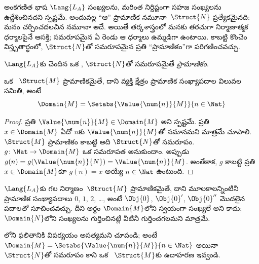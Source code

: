 \documentclass[../../../include/open-logic-section]{subfiles}
\begin{document}

అంకగణిత భాష $\Lang{L_A}$ సంఖ్యలను, మరింత నిర్దిష్టంగా సహజ
సంఖ్యలను ఉద్దేశించినదని స్పష్టమే. అందువల్ల “ఆ” ప్రామాణిక
నమూనా~$\Struct{N}$ ప్రత్యేకమైనది: మనం చర్చించదలచిన నమూనా అదే.
అయితే తర్కశాస్త్రంలో మనకు తరచుగా నిర్మాణాత్మక ధర్మాలపైనే ఆసక్తి;
సమరూపమైన ఏ రెండు  ఆ ధర్మాలు ఉమ్మడిగా ఉంటాయి.
కాబట్టి కొంచెం విస్తృతార్థంలో, $\Struct{N}$తో సమరూపమైన ప్రతి
 “ప్రామాణికం”గా పరిగణించవచ్చు.

\begin{defn}
$\Lang{L_A}$కు చెందిన ఒక ,
$\Struct{N}$తో సమరూపమైతే \emph{ప్రామాణికం}.
\end{defn}

\begin{prop}
 ఒక
~$\Struct{M}$ ప్రామాణికమైతే,
దాని వ్యక్తి క్షేత్రం ప్రామాణిక సంఖ్యాపదాల విలువల సమితి, అంటే
\[
\Domain{M} = \Setabs{\Value{\num{n}}{M}}{n \in \Nat}
\]
\end{prop}

\begin{proof}
ప్రతి $\Value{\num{n}}{M}\in\Domain{M}$ అని స్పష్టమే. ప్రతి
$x\in\Domain{M}$ ఏదో $n$కు $\Value{\num{n}}{M}$తో సమానమని మాత్రమే
చూపాలి. $\Struct{M}$ ప్రామాణికం కాబట్టి అది $\Struct{N}$తో
సమరూపం. $g\colon\Nat\to\Domain{M}$ ఒక సమరూపత అనుకుందాం. అప్పుడు
$g(n)=g(\Value{\num{n}}{N})=\Value{\num{n}}{M}$. అంతేకాక, $g$
 కాబట్టి ప్రతి
$x\in\Domain{M}$కూ $g(n)=x$ అయ్యే $n\in\Nat$ ఉంటుంది.
\end{proof}

\begin{explain}
$\Lang{L_A}$కు గల నిర్మాణం~$\Struct{M}$ ప్రామాణికమైతే, దాని
 మూలకాలన్నింటినీ
ప్రామాణిక సంఖ్యాపదాలు $\num{0}$, $\num{1}$, $\num{2}$, \dots,
అంటే $\Obj{0}$, $\Obj{0}'$, $\Obj{0}''$ మొదలైన పదాలతో
సూచించవచ్చు. దీని అర్థం $\Domain{M}$లోని
 స్వయంగా సంఖ్యలే అని కాదు;
$\Domain{N}$లోని సంఖ్యలను గుర్తించినట్లే వీటినీ గుర్తించగలమని మాత్రమే.
\end{explain}

\begin{prob}
లోని ఫలితానికి విపర్యయం అసత్యమని
చూపండి; అంటే
$\Domain{M}=\Setabs{\Value{\num{n}}{M}}{n\in\Nat}$ అయినా
$\Struct{N}$తో సమరూపం కాని ఒక
~$\Struct{M}$కు ఉదాహరణ ఇవ్వండి.
\end{prob}
\end{document}
